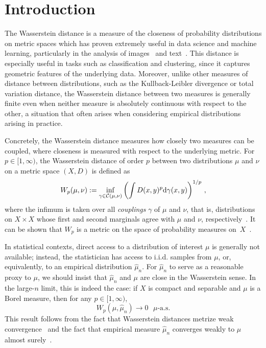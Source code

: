 \documentclass[sts]{imsart}
\begin{document}
\section{Introduction}
The Wasserstein distance is a measure of the closeness of probability distributions on metric spaces which has proven extremely useful in data science and machine learning, particularly in the analysis of images~\cite{RubTomGui00,SolGoeCut15,SanLin11} and text~\cite{KusSunKol15,ZhaLiuLua16}.
This distance is especially useful in tasks such as classification and clustering, since it captures geometric features of the underlying data.
Moreover, unlike other measures of distance between distributions, such as the Kullback-Leibler divergence or total variation distance, the Wasserstein distance between two measures is generally finite even when neither measure is absolutely continuous with respect to the other, a situation that often arises when considering empirical distributions arising in practice.

Concretely, the Wasserstein distance measures how closely two measures can be coupled, where closeness is measured with respect to the underlying metric.
For $p \in [1, \infty)$, the Wasserstein distance of order $p$ between two distributions $\mu$ and $\nu$ on a metric space $(X, D)$ is defined as
\begin{equation*}
W_p(\mu, \nu) := \inf_{\gamma \in \mathcal{C}(\mu, \nu)} \left(\int D(x, y)^p \mathrm{d}\gamma(x, y)\right)^{1/p}\,,
\end{equation*}
where the infimum is taken over all \emph{couplings} $\gamma$ of $\mu$ and $\nu$, that is, distributions on $X \times X$ whose first and second marginals agree with $\mu$ and $\nu$, respectively~\cite{Kan42}.
It can be shown that $W_p$ is a metric on the space of probability measures on~$X$~\cite[Chapter 6]{Vil09}.

In statistical contexts, direct access to a distribution of interest $\mu$ is generally not available; instead, the statistician has access to i.i.d. samples from $\mu$, or, equivalently, to an empirical distribution $\hat \mu_n$.
For $\hat \mu_n$ to serve as a reasonable proxy to $\mu$, we should insist that $\hat \mu_n$ and $\mu$ are close in the Wasserstein sense.
In the large-$n$ limit, this is indeed the case: if $X$ is compact and separable and $\mu$ is a Borel measure, then for any $p \in [1, \infty)$,
\begin{equation*}
W_p(\mu, \hat \mu_n) \to 0 \text{ $\mu$-a.s.}
\end{equation*}
This result follows from the fact that Wasserstein distances metrize weak convergence~\cite[Corollary~6.13]{Vil09} and the fact that empirical measure $\hat \mu_n$ converges weakly to $\mu$ almost surely~\cite{Var58}.
\end{document}
